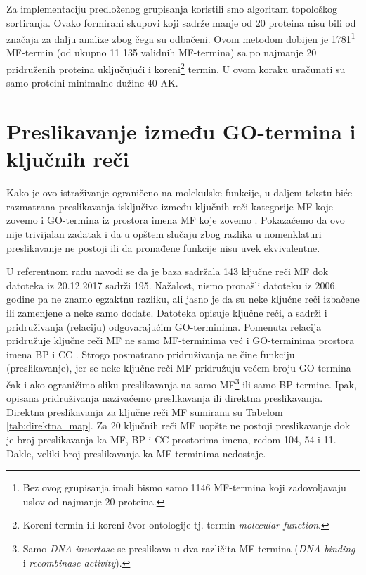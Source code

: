 Za implementaciju predloženog grupisanja koristili smo algoritam topološkog
sortiranja. Ovako formirani skupovi koji sadrže manje od 20 proteina nisu bili
od značaja za dalju analize zbog čega su odbačeni.
Ovom metodom dobijen je 1781\footnote{Bez ovog grupisanja imali bismo samo 1146
MF-termina  koji zadovoljavaju uslov od najmanje 20 proteina.} MF-termin (od ukupno
11 135 validnih MF-termina) sa po najmanje 20 pridruženih proteina uključujući i
koreni\footnote{Koreni termin ili koreni čvor ontologije tj.  termin
\textit{molecular function}.} termin. U ovom koraku uračunati su samo proteini
minimalne dužine 40 AK.

\section{Preslikavanje između GO-termina i ključnih reči}
\label{kw2go_mapiranje}

Kako je ovo istraživanje ograničeno na molekulske funkcije, u daljem tekstu
biće razmatrana preslikavanja isključivo između ključnih reči kategorije MF koje
zovemo  i GO-termina iz prostora imena MF koje zovemo
. Pokazaćemo da ovo nije trivijalan zadatak i da u opštem
slučaju zbog razlika u nomenklaturi preslikavanje ne postoji ili da pronađene
funkcije nisu uvek ekvivalentne.

U referentnom radu navodi se da je baza \swissprot sadržala 143 ključne reči MF
dok  datoteka  \cite{keywlist_txt} iz 20.12.2017 sadrži 195.
Nažalost, nismo pronašli   datoteku iz 2006. godine pa ne
znamo egzaktnu razliku, ali jasno je da su neke ključne reči
izbačene ili zamenjene a neke samo dodate. Datoteka  opisuje
ključne reči, a sadrži i pridruživanja (relaciju) odgovarajućim GO-terminima.
Pomenuta relacija pridružuje ključne reči MF ne samo MF-terminima već i
GO-terminima prostora imena BP i CC . Strogo posmatrano pridruživanja ne
čine funkciju (preslikavanje), jer se neke ključne reči MF pridružuju većem
broju GO-termina čak i ako ograničimo sliku preslikavanja na samo
MF\footnote{Samo \textit{DNA invertase} se preslikava u dva različita
MF-termina (\textit{DNA binding} i \textit{recombinase activity}).} ili samo
BP-termine.  Ipak, opisana pridruživanja nazivaćemo preslikavanja ili direktna
preslikavanja. Direktna preslikavanja za ključne reči MF sumirana su Tabelom
\ref{tab:direktna_map}.  Za 20 ključnih reči MF uopšte ne postoji preslikavanje
dok je broj preslikavanja ka MF, BP i CC prostorima imena, redom 104, 54 i
11. Dakle, veliki broj preslikavanja ka MF-terminima nedostaje.

